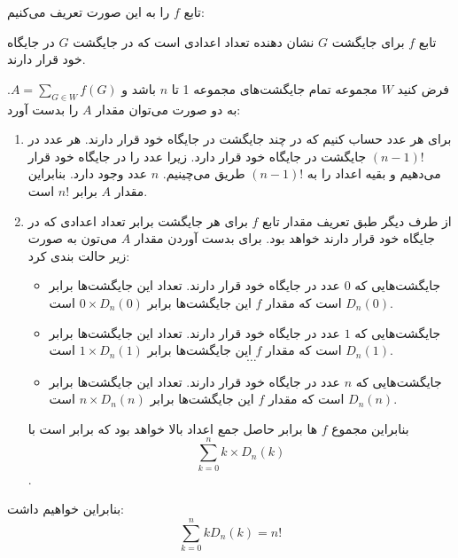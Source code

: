 \p
	تابع $f$ را به این صورت تعریف می‌کنیم:
	
	تابع $f$ برای جایگشت $G$ نشان دهنده تعداد اعدادی است که در جایگشت $G$ در جایگاه خود قرار دارند.
	
فرض کنید $W$ مجموعه تمام جایگشت‌های مجموعه 1 تا $n$ باشد و $A=\sum_{G \in W} f(G)$. به دو صورت می‌توان مقدار $A$ را بدست آورد:
	\begin{enumerate}
		\item 
		برای هر عدد حساب کنیم که در چند جایگشت در جایگاه خود قرار دارند.
		هر عدد در $(n-1)!$ جایگشت در جایگاه خود قرار دارد. زیرا عدد را در جایگاه خود قرار می‌دهیم و بقیه اعداد را به $(n-1)!$ طریق می‌چینیم. $n$ عدد وجود دارد. بنابراین مقدار $A$ برابر $n!$ است.
		
		\item
		از طرف دیگر طبق تعریف مقدار تابع $f$ برای هر جایگشت برابر تعداد اعدادی که در جایگاه خود قرار دارند خواهد بود. برای بدست آوردن مقدار $A$ می‌تون به صورت زیر حالت بندی کرد:
		
		\begin{itemize}
			\item 
			جایگشت‌هایی که $0$ عدد در جایگاه خود قرار دارند. تعداد این جایگشت‌ها برابر $D_n(0)$ است که مقدار $f$ این جایگشت‌ها برابر $0\times D_n(0)$ است.
			\item
			جایگشت‌هایی که $1$ عدد در جایگاه خود قرار دارند. تعداد این جایگشت‌ها برابر $D_n(1)$ است که مقدار $f$ این جایگشت‌ها برابر $1\times D_n(1)$ است.
			$$\dots$$
			\item
			جایگشت‌هایی که $n$ عدد در جایگاه خود قرار دارند. تعداد این جایگشت‌ها برابر $D_n(n)$ است که مقدار $f$ این جایگشت‌ها برابر $n\times D_n(n)$ است.
		\end{itemize}
	بنابراین مجموع $f$ ها برابر حاصل جمع اعداد بالا خواهد بود که برابر است با $$\sum_{k=0}^{n} k \times D_n(k)$$.
	\end{enumerate} 
	
	
	بنابراین خواهیم داشت:
	$$\sum_{k=0}^{n} kD_n(k) = n!$$
